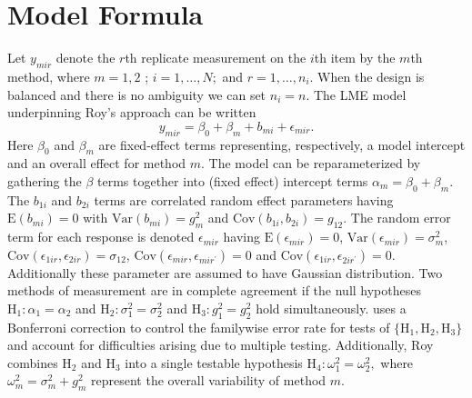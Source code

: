 \documentclass[12pt, a4paper]{report}
\theoremstyle{plain}
\theoremstyle{definition}
\theoremstyle{remark}
\begin{document}

\newpage
\section{Model Formula}
Let $y_{mir} $ denote the $r$th replicate measurement on the $i$th item by the $m$th method, where $m=1,2$ ; $i=1,\ldots,N;$ and $r = 1,\ldots,n_i.$ When the design is balanced and there is no ambiguity we can set $n_i=n.$ The LME model underpinning Roy's approach can be written
\begin{equation}\label{Roy-model}
y_{mir} = \beta_{0} + \beta_{m} + b_{mi} + \epsilon_{mir}.
\end{equation}
Here $\beta_0$ and $\beta_m$ are fixed-effect terms representing, respectively, a model intercept and an overall effect for method $m.$ The model can be reparameterized by gathering the $\beta$ terms together into (fixed effect) intercept terms $\alpha_m=\beta_0+\beta_m.$ The $b_{1i}$ and $b_{2i}$ terms are correlated random effect parameters having $\mathrm{E}(b_{mi})=0$ with $\mathrm{Var}(b_{mi})=g^2_m$ and $\mathrm{Cov}(b_{1i}, b_{2 i})=g_{12}.$ The random error term for each response is denoted $\epsilon_{mir}$ having $\mathrm{E}(\epsilon_{mir})=0$, $\mathrm{Var}(\epsilon_{mir})=\sigma^2_m$, $\mathrm{Cov}(\epsilon_{1ir}, \epsilon_{2 ir})=\sigma_{12}$, $\mathrm{Cov}(\epsilon_{mir}, \epsilon_{mir^\prime})= 0$ and $\mathrm{Cov}(\epsilon_{1ir}, \epsilon_{2 ir^\prime})= 0.$ Additionally these parameter are assumed to have Gaussian distribution. Two methods of measurement are in complete agreement if the null hypotheses $\mathrm{H}_1\colon \alpha_1 = \alpha_2$ and $\mathrm{H}_2\colon \sigma^2_1 = \sigma^2_2 $ and $\mathrm{H}_3\colon g^2_1= g^2_2$ hold simultaneously. \citet{roy} uses a Bonferroni correction to control the familywise error rate for tests of $\{\mathrm{H}_1, \mathrm{H}_2, \mathrm{H}_3\}$ and account for difficulties arising due to multiple testing. Additionally, Roy combines $\mathrm{H}_2$ and $\mathrm{H}_3$ into a single testable hypothesis $\mathrm{H}_4\colon \omega^2_1=\omega^2_2,$ where $\omega^2_m = \sigma^2_m + g^2_m$ represent the overall variability of method $m.$
\end{document}
